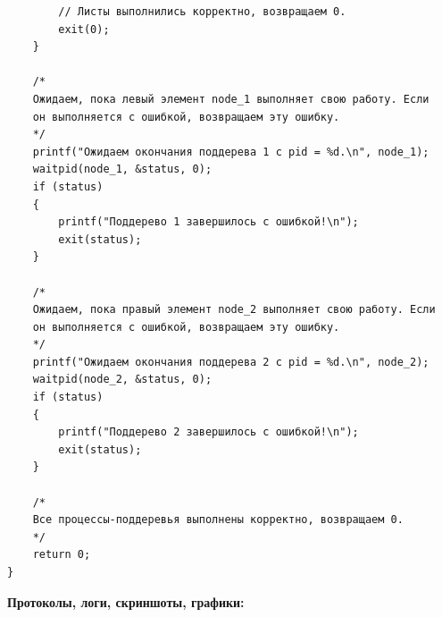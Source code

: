 \documentclass[a4paper,14pt]{extarticle}
\begin{document}
\begin{verbatim}
        // Листы выполнились корректно, возвращаем 0.
        exit(0);
    }

    /*
    Ожидаем, пока левый элемент node_1 выполняет свою работу. Если
    он выполняется с ошибкой, возвращаем эту ошибку.
    */
    printf("Ожидаем окончания поддерева 1 с pid = %d.\n", node_1);
    waitpid(node_1, &status, 0);
    if (status)
    {
        printf("Поддерево 1 завершилось с ошибкой!\n");
        exit(status);
    }

    /*
    Ожидаем, пока правый элемент node_2 выполняет свою работу. Если
    он выполняется с ошибкой, возвращаем эту ошибку.
    */
    printf("Ожидаем окончания поддерева 2 с pid = %d.\n", node_2);
    waitpid(node_2, &status, 0);
    if (status)
    {
        printf("Поддерево 2 завершилось с ошибкой!\n");
        exit(status);
    }

    /*
    Все процессы-поддеревья выполнены корректно, возвращаем 0.
    */
    return 0;
}
\end{verbatim}

\textbf{Протоколы, логи, скриншоты, графики:}\bigbreak
\end{document}
